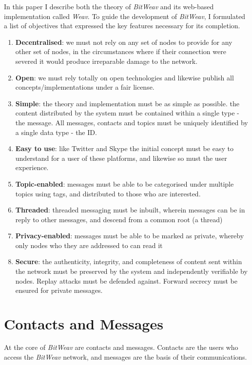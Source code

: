 \documentclass[10pt,a4paper,onecolumn]{article}
\begin{document}
In this paper I describe both the theory of \textit{BitWeav} and its web-based implementation called \textit{Weav}. To guide the development of \textit{BitWeav}, I formulated a list of objectives that expressed the key features necessary for its completion.
\begin{enumerate}
\item \textbf{Decentralised}: we must not rely on any set of nodes to provide for any other set of nodes, in the circumstances where if their connection were severed it would produce irreparable damage to the network. 

\item \textbf{Open}: we must rely totally on open technologies and likewise publish all concepts/implementations under a fair license.

\item \textbf{Simple}: the theory and implementation must be as simple as possible. the content distributed by the system must be contained within a single type - the message. All messages, contacts and topics must be uniquely identified by a single data type - the ID.

\item \textbf{Easy to use}: like Twitter and Skype the initial concept must be easy to understand for a user of these platforms, and likewise so must the user experience.

\item \textbf{Topic-enabled}: messages must be able to be categorised under multiple topics using tags, and distributed to those who are interested.

\item \textbf{Threaded}: threaded messaging must be inbuilt, wherein messages can be in reply to other messages, and descend from a common root (a thread)

\item \textbf{Privacy-enabled}: messages must be able to be marked as private, whereby only nodes who they are addressed to can read it

\item \textbf{Secure}: the authenticity, integrity, and completeness of content sent within the network must be preserved by the system and independently verifiable by nodes. Replay attacks must be defended against. Forward secrecy must be ensured for private messages.
\end{enumerate}

\section{Contacts and Messages}
At the core of \textit{BitWeav} are contacts and messages. Contacts are the users who access the \textit{BitWeav} network, and messages are the basis of their communications.
\end{document}
